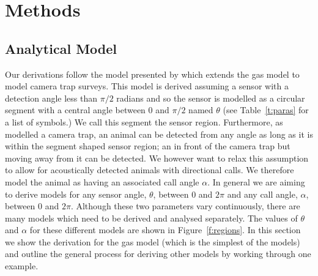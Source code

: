\documentclass[a4paper,10pt,reqno,oneside]{amsart}
\begin{document}

\section{Methods}

\subsection{Analytical Model}

Our derivations follow the model presented by \cite{rowcliffe2008estimating} which extends the gas model to model camera trap surveys. This model is derived assuming a sensor with a detection angle less than $\pi/2$ radians and so the sensor is modelled as a circular segment with a central angle between 0 and  $\pi/2$ named  $\theta$ (see Table~\ref{t:paras} for a list of symbols.) We call this segment the sensor region. Furthermore, as \cite{rowcliffe2008estimating}  modelled a camera trap, an animal can be detected from any angle as long as it is within the segment shaped sensor region; an in front of the camera trap but moving away from it can be detected. We however want to relax this assumption to allow for acoustically detected animals with directional calls. We therefore model the animal as having an associated call angle $\alpha$. In general we are aiming to derive models for any sensor angle, $ \theta$, between 0 and $2\pi$ and any call angle, $ \alpha$, between 0 and $2\pi$. Although these two parameters vary continuously, there are many models which need to be derived and analysed separately. The values of $\theta$ and $\alpha$ for these different models are shown in Figure~\ref{f:regions}. In this section we show the derivation for the gas model (which is the simplest of the models) and outline the general process for deriving other models by working through one example. 
\end{document}
